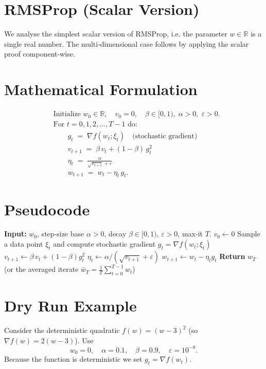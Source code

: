 \documentclass[11pt]{article}
\newcommand{\R}{\mathbb{R}}
\begin{document}
\section*{RMSProp (Scalar Version)}

We analyse the simplest scalar version of RMSProp, i.e. the parameter $w\in\R$ is a single real number.  The multi‑dimensional case follows by applying the scalar proof component‑wise.

\section*{Mathematical Formulation}
\begin{align}
    &\text{Initialize } w_0\in\R,\quad v_0=0, \quad \beta\in[0,1),\;\alpha>0,\;\varepsilon>0. \nonumber\\[4pt]
    &\text{For } t=0,1,2,\dots,T-1 \text{ do: } \nonumber\\
    &\qquad g_t \;=\; \nabla f(w_t;\xi_t) \quad\text{(stochastic gradient)}\label{eq:gt}\\
    &\qquad v_{t+1} \;=\; \beta\,v_t + (1-\beta)\,g_t^{2} \label{eq:vt}\\
    &\qquad \eta_t \;=\; \frac{\alpha}{\sqrt{v_{t+1}}+\varepsilon} \label{eq:stepsize}\\
    &\qquad w_{t+1} \;=\; w_t - \eta_t\, g_t . \label{eq:update}
\end{align}

\section*{Pseudocode}
\begin{algorithm}[H]
\caption{RMSProp (scalar)}\label{alg:rmsprop}
\begin{algorithmic}[1]
\State \textbf{Input:} $w_0$, step‑size base $\alpha>0$, decay $\beta\in[0,1)$, $\varepsilon>0$, max‑it $T$.
\State $v_0\gets 0$
    \State Sample a data point $\xi_t$ and compute stochastic gradient $g_t=\nabla f(w_t;\xi_t)$
    \State $v_{t+1}\gets \beta\,v_t + (1-\beta)g_t^{2}$
    \State $\eta_t \gets \alpha/(\sqrt{v_{t+1}}+\varepsilon)$
    \State $w_{t+1}\gets w_t - \eta_t g_t$
\EndFor
\State \textbf{Return} $w_T$ (or the averaged iterate $\bar w_T=\frac1T\sum_{t=0}^{T-1} w_t$)
\end{algorithmic}
\end{algorithm}

\section*{Dry Run Example}
Consider the deterministic quadratic $f(w)=(w-3)^2$ (so $\nabla f(w)=2(w-3)$).  Use
\[
w_0=0,\quad \alpha=0.1,\quad \beta=0.9,\quad \varepsilon=10^{-8}.
\]
Because the function is deterministic we set $g_t=\nabla f(w_t)$.
\end{document}
